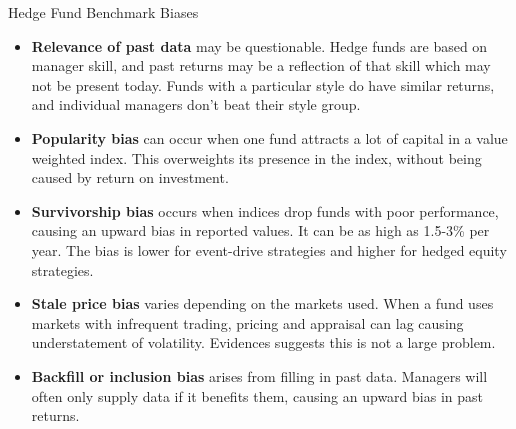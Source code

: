 \documentclass[../custom,grid]{flashcards}
\begin{document}
\begin{flashcard}{Hedge Fund Benchmark Biases}
    \begin{itemize}
        \item \textbf{Relevance of past data} may be questionable. Hedge funds are based on manager skill, and past returns may be a reflection of that skill which may not be present today. Funds with a particular style do have similar returns, and individual managers don't beat their style group.
        \item \textbf{Popularity bias} can occur when one fund attracts a lot of capital in a value weighted index. This overweights its presence in the index, without being caused by return on investment.
        \item \textbf{Survivorship bias} occurs when indices drop funds with poor performance, causing an upward bias in reported values. It can be as high as 1.5-3\% per year. The bias is lower for event-drive strategies and higher for hedged equity strategies.
        \item \textbf{Stale price bias} varies depending on the markets used. When a fund uses markets with infrequent trading, pricing and appraisal can lag causing understatement of volatility. Evidences suggests this is not a large problem.
        \item \textbf{Backfill or inclusion bias} arises from filling in past data. Managers will often only supply data if it benefits them, causing an upward bias in past returns.
    \end{itemize}
\end{flashcard}
\end{document}
